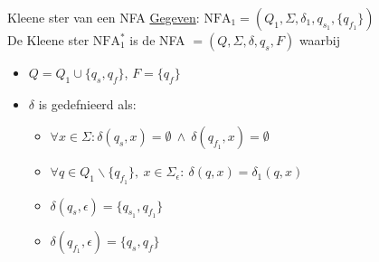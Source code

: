\begin{pro}{Kleene ster van een NFA}
    \underline{Gegeven}: $\text{NFA}_1 = (Q_1,\Sigma, \delta_1, q_{s_1}, \{q_{f_1}\})$ \\

    De Kleene ster $\text{NFA}_1^*$ is de NFA $= (Q,\Sigma, \delta, q_s, F)$ waarbij \\

    \vspace{-0.1cm}
    \begin{minipage}{.56\textwidth}
        \begin{itemize}
            \item $Q = Q_1 \cup \{q_s, q_f\}$, $F = \{q_f\}$
            \item 
                $\delta$ is gedefnieerd als:
                \begin{itemize}
                    \item $\forall x \in \Sigma: \delta(q_{s}, x) = \emptyset \ \land \ \delta(q_{f_1}, x) = \emptyset$
                    \item $\forall q \in Q_{1}\backslash \{q_{f_1}\}, \ x \in \Sigma_{\epsilon}: \ \delta(q,x) = \delta_1(q,x)$
                    \item $\delta(q_s, \epsilon) = \{q_{s_1}, q_{f_1}\}$
                    \item $\delta(q_{f_1}, \epsilon) = \{q_{s}, q_{f}\}$
                \end{itemize}
        \end{itemize}

\end{minipage}
\end{pro}
